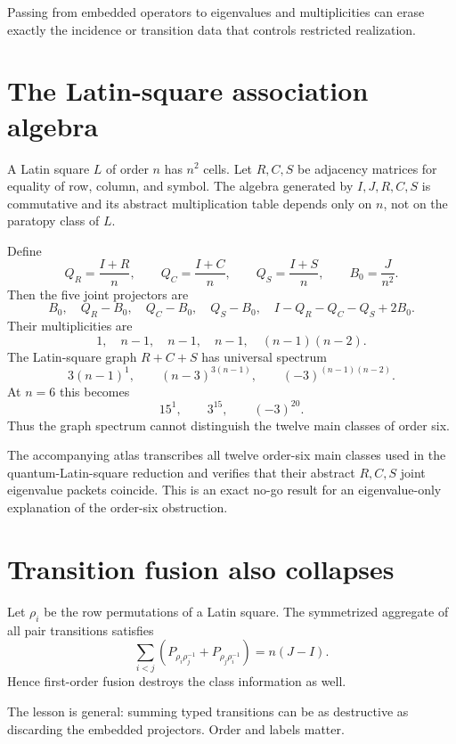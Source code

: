\begin{principle}
Passing from embedded operators to eigenvalues and multiplicities can erase exactly the incidence or transition data that controls restricted realization.
\end{principle}

\section{The Latin-square association algebra}
A Latin square $L$ of order $n$ has $n^2$ cells.  Let $R,C,S$ be adjacency matrices for equality of row, column, and symbol.  The algebra generated by $I,J,R,C,S$ is commutative and its abstract multiplication table depends only on $n$, not on the paratopy class of $L$.

Define
\[
Q_R=\frac{I+R}{n},
\qquad
Q_C=\frac{I+C}{n},
\qquad
Q_S=\frac{I+S}{n},
\qquad
B_0=\frac{J}{n^2}.
\]
Then the five joint projectors are
\[
B_0,
\quad Q_R-B_0,
\quad Q_C-B_0,
\quad Q_S-B_0,
\quad I-Q_R-Q_C-Q_S+2B_0.
\]
Their multiplicities are
\[
1,
\quad n-1,
\quad n-1,
\quad n-1,
\quad (n-1)(n-2).
\]
The Latin-square graph $R+C+S$ has universal spectrum
\[
3(n-1)^1,
\qquad
(n-3)^{3(n-1)},
\qquad
(-3)^{(n-1)(n-2)}.
\]
At $n=6$ this becomes
\[
15^1,\qquad3^{15},\qquad(-3)^{20}.
\]
Thus the graph spectrum cannot distinguish the twelve main classes of order six.

\begin{computedbox}
The accompanying atlas transcribes all twelve order-six main classes used in the quantum-Latin-square reduction and verifies that their abstract $R,C,S$ joint eigenvalue packets coincide.  This is an exact no-go result for an eigenvalue-only explanation of the order-six obstruction.
\end{computedbox}

\section{Transition fusion also collapses}
Let $\rho_i$ be the row permutations of a Latin square.  The symmetrized aggregate of all pair transitions satisfies
\begin{equation}\label{eq:transition-fusion}
\sum_{i<j}
\left(
P_{\rho_i\rho_j^{-1}}
+
P_{\rho_j\rho_i^{-1}}
\right)
=n(J-I).
\end{equation}
Hence first-order fusion destroys the class information as well.

The lesson is general: summing typed transitions can be as destructive as discarding the embedded projectors.  Order and labels matter.

